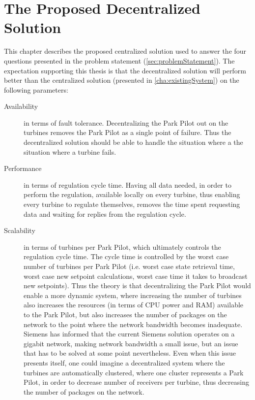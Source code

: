 \chapter{The Proposed Decentralized Solution}\label{cha:decentralizedSystem}

This chapter describes the proposed centralized solution used to answer the four questions presented in the problem statement (\cref{sec:problemStatement}). The expectation supporting this thesis is that the decentralized solution will perform better than the centralized solution (presented in \cref{cha:existingSystem}) on the following parameters:

\begin{description}
	\item[Availability] in terms of fault tolerance. Decentralizing the Park Pilot out on the turbines removes the Park Pilot as a single point of failure. Thus the decentralized solution should be able to handle the situation where a the situation where a turbine fails.
	\item[Performance] in terms of regulation cycle time. Having all data needed, in order to perform the regulation, available locally on every turbine, thus enabling every turbine to regulate themselves, removes the time spent requesting data and waiting for replies from the regulation cycle.
	\item[Scalability] in terms of turbines per Park Pilot, which ultimately controls the regulation cycle time. The cycle time is controlled by the worst case number of turbines per Park Pilot (i.e. worst case state retrieval time, worst case new setpoint calculations, worst case time it takes to broadcast new setpoints). Thus the theory is that decentralizing the Park Pilot would enable a more dynamic system, where increasing the number of turbines also increases the resources (in terms of CPU power and RAM) available to the Park Pilot, but also increases the number of packages on the network to the point where the network bandwidth becomes inadequate. Siemens has informed that the current Siemens solution operates on a gigabit network, making network bandwidth a small issue, but an issue that has to be solved at some point nevertheless. Even when this issue presents itself, one could imagine a decentralized system where the turbines are automatically clustered, where one cluster represents a Park Pilot, in order to decrease number of receivers per turbine, thus decreasing the number of packages on the network.
\end{description}


